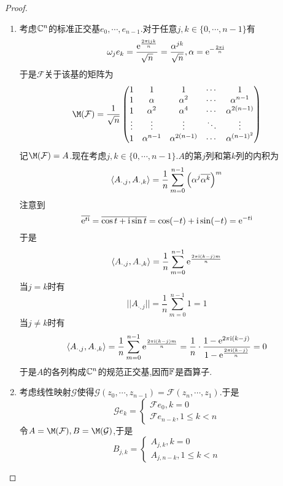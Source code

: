 \documentclass{ctexart}
\begin{document}
\begin{proof}
    \begin{enumerate}[label=\tbf{(\arabic*)}]
        \item 考虑$\mathbb{C}^n$的标准正交基$e_0,\cdots,e_{n-1}$.对于任意$j,k\in\{0,\cdots,n-1\}$有
            \[\omega_je_k=\dfrac{\mathrm{e}^{\frac{2\pi\text{i} jk}{n}}}{\sqrt{n}}=\dfrac{\alpha^{jk}}{\sqrt{n}},\alpha=\mathrm{e}^{-\frac{2\pi\text{i}}{n}}\]
            于是$\mathcal{F}$关于该基的矩阵为
            \[\M(\mathcal{F})=\dfrac{1}{\sqrt{n}}\begin{pmatrix}
                1&1&1&\cdots&1\\
                1&\alpha&\alpha^2&\cdots&\alpha^{n-1}\\
                1&\alpha^2&\alpha^4&\cdots&\alpha^{2(n-1)}\\
                \vdots&\vdots&\vdots&\ddots&\vdots\\
                1&\alpha^{n-1}&\alpha^{2(n-1)}&\cdots&\alpha^{(n-1)^2}
            \end{pmatrix}\]
            记$\M(\mathcal{F})=A$.现在考虑$j,k\in\{0,\cdots,n-1\}$.$A$的第$j$列和第$k$列的内积为
            \[\left\langle{A_{\cdot,j}},{A_{\cdot,k}}\right\rangle=\dfrac{1}{n}\sum_{m=0}^{n-1}\left(\alpha^j\overline{\alpha^k}\right)^m\]
            注意到
            \[\overline{\mathrm{e}^{t\text{i}}}=\overline{\cos t+\text{i}\sin t}=\cos(-t)+\text{i}\sin(-t)=\mathrm{e}^{-t\text{i}}\]
            于是
            \[\left\langle{A_{\cdot,j}},{A_{\cdot,k}}\right\rangle=\dfrac{1}{n}\sum_{m=0}^{n-1}\mathrm{e}^{\frac{2\pi\text{i}(k-j)m}{n}}\]
            当$j=k$时有
            \[||A_{\cdot,j}||=\dfrac 1n\sum_{m=0}^{n-1}1=1\]
            当$j\neq k$时有
            \[\left\langle{A_{\cdot,j}},{A_{\cdot,k}}\right\rangle=\dfrac{1}{n}\sum_{m=0}^{n-1}\mathrm{e}^{\frac{2\pi\text{i}(k-j)m}{n}}=\dfrac 1n\cdot\dfrac{1-\mathrm{e}^{2\pi\text{i}(k-j)}}{1-\mathrm{e}^{\frac{2\pi\text{i}(k-j)}{n}}}=0\]
            于是$A$的各列构成$\mathbb{C}^n$的规范正交基,因而$\mathbb{F}$是酉算子.
        \item 考虑线性映射$\mathcal{G}$使得$\mathcal{G}(z_0,\cdots,z_{n-1})=\mathcal{F}(z_n,\cdots,z_1)$.于是
            \[\mathcal{G}e_k=\left\{\begin{array}{l}
                \mathcal{F}e_0,k=0\\
                \mathcal{F}e_{n-k},1\leqslant k<n
            \end{array}\right.\]
            令$A=\M(\mathcal{F}),B=\M(\mathcal{G})$,于是
            \[B_{j,k}=\left\{\begin{array}{l}
                A_{j,k},k=0\\
                A_{j,n-k},1\leqslant k<n
            \end{array}\right.\]

\end{enumerate}
\end{proof}
\end{document}

